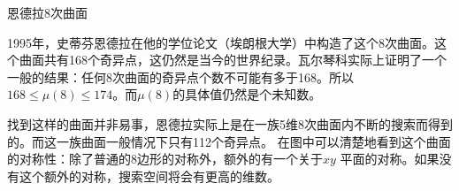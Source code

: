 ﻿\begin{surferPage}{ 恩德拉8次曲面}

1995年，史蒂芬恩德拉在他的学位论文（埃朗根大学）中构造了这个8次曲面。这个曲面共有168个奇异点，这仍然是当今的世界纪录。瓦尔琴科实际上证明了一个一般的结果：任何8次曲面的奇异点个数不可能有多于168。所以$168 \le \mu(8) \le 174$。而$\mu(8)$的具体值仍然是个未知数。

找到这样的曲面并非易事，恩德拉实际上是在一族5维8次曲面内不断的搜索而得到的。而这一族曲面一般情况下只有112个奇异点。
在图中可以清楚地看到这个曲面的对称性：除了普通的8边形的对称外，额外的有一个关于$xy$ 平面的对称。如果没有这个额外的对称，搜索空间将会有更高的维数。
\end{surferPage}

